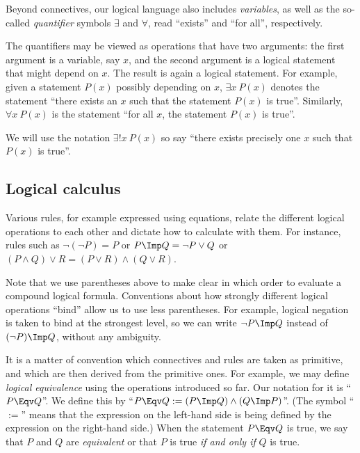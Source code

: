Beyond connectives, our logical language also includes \emph{variables}, as well as the so-called \emph{quantifier} symbols $\exists$ and $\forall$, read ``exists'' and ``for all'', respectively. 

The quantifiers may be viewed as operations that have two arguments: the first argument is a variable, say $x$, and the second argument is a logical statement that might depend on $x$. The result is again a logical statement. For example, given a statement $P(x)$ possibly depending on $x$, $\exists x \ P(x)$ denotes the statement ``there exists an $x$ such that the statement $P(x)$ is true''. Similarly, $\forall x \ P(x)$ is the statement ``for all $x$, the statement $P(x)$ is true''. 

We will use the notation $\exists! x \ P(x)$ so say ``there exists precisely one $x$ such that $P(x)$ is true''. 


\subsection{Logical calculus}

Various rules, for example expressed using equations, relate the different logical operations to each other and dictate how to calculate with them. For instance, rules such as $\lnot (\lnot P) = P$ or $P \Imp Q = \lnot P \vee Q$ or $(P \wedge Q) \vee R = (P \vee R) \wedge (Q \vee R)$. 

Note that we use parentheses above to make clear in which order to evaluate a compound logical formula. Conventions about how strongly different logical operations ``bind'' allow us to use less parentheses. For example, logical negation is taken to bind at the strongest level, so we can write $\lnot P \Imp Q$ instead of $(\lnot P) \Imp Q$, without any ambiguity. 

It is a matter of convention which connectives and rules are taken as primitive, and which are then derived from the primitive ones. For example, we may define \emph{logical equivalence} using the operations introduced so far. Our notation for it is ``$P \Eqv Q$''. We define this by ``$P \Eqv Q := (P \Imp Q) \wedge (Q \Imp P)$''. (The symbol ``$:=$'' means that the expression on the left-hand side is being defined by the expression on the right-hand side.) When the statement $P \Eqv Q$ is true, we say that $P$ and $Q$ are \emph{equivalent} or that $P$ is true \emph{if and only if} $Q$ is true. 

